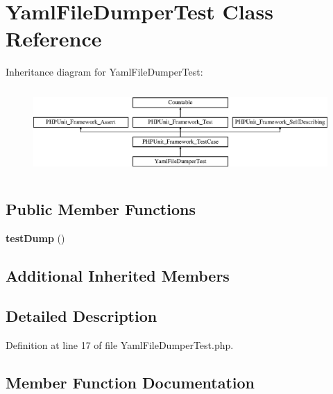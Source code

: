 \section{Yaml\+File\+Dumper\+Test Class Reference}
\label{class_symfony_1_1_component_1_1_translation_1_1_tests_1_1_dumper_1_1_yaml_file_dumper_test}
Inheritance diagram for Yaml\+File\+Dumper\+Test\+:\begin{figure}[H]
\begin{center}
\leavevmode
\includegraphics[height=3.303835cm]{class_symfony_1_1_component_1_1_translation_1_1_tests_1_1_dumper_1_1_yaml_file_dumper_test}
\end{center}
\end{figure}
\subsection*{Public Member Functions}
\begin{DoxyCompactItemize}
\item 
{\bf test\+Dump} ()
\end{DoxyCompactItemize}
\subsection*{Additional Inherited Members}


\subsection{Detailed Description}


Definition at line 17 of file Yaml\+File\+Dumper\+Test.\+php.



\subsection{Member Function Documentation}
